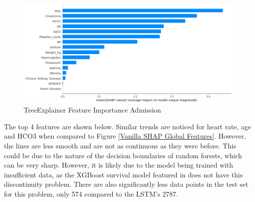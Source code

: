 \documentclass[12pt]{article}
\begin{document}
\begin{figure}[H]
\centering\caption{TreeExplainer Feature Importance Admission}
\includegraphics[scale=0.49]{TreeExplainer Admission1 Feature Importance.png}
\end{figure}
The top 4 features are shown below. Similar trends are noticed for heart rate, age and HCO3 when compared to Figure \ref{Vanilla SHAP Global Features}. However, the lines are less smooth and are not as continuous as they were before. This could be due to the nature of the decision boundaries of random forests, which can be very sharp. However, it is likely due to the model being trained with insufficient data, as the XGBoost survival model featured in \cite{SHAPInteraction} does not have this discontinuity problem. There are also significantly less data points in the test set for this problem, only 574 compared to the LSTM's 2787. 
\end{document}
